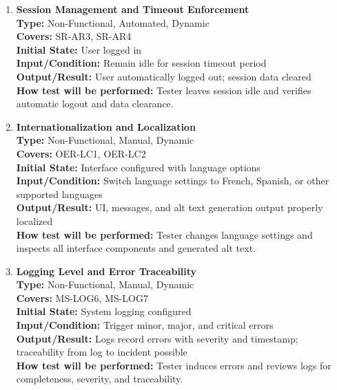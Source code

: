 \documentclass[12pt, titlepage]{article}
\begin{document}
\begin{enumerate}[label=NFR-ST \arabic*., wide=0pt, leftmargin=*]
  \item \textbf{Session Management and Timeout Enforcement} \\[2mm]
    \textbf{Type:} Non-Functional, Automated, Dynamic \\
    \textbf{Covers:} SR-AR3, SR-AR4 \\
    \textbf{Initial State:} User logged in \\
    \textbf{Input/Condition:} Remain idle for session timeout period \\
    \textbf{Output/Result:} User automatically logged out; session
    data cleared \\[2mm]
    \textbf{How test will be performed:} Tester leaves session idle
    and verifies automatic logout and data clearance.

  \item \textbf{Internationalization and Localization} \\[2mm]
    \textbf{Type:} Non-Functional, Manual, Dynamic \\
    \textbf{Covers:} OER-LC1, OER-LC2 \\
    \textbf{Initial State:} Interface configured with language options \\
    \textbf{Input/Condition:} Switch language settings to French,
    Spanish, or other supported languages \\
    \textbf{Output/Result:} UI, messages, and alt text generation
    output properly localized \\[2mm]
    \textbf{How test will be performed:} Tester changes language
    settings and inspects all interface components and generated alt text.

  \item \textbf{Logging Level and Error Traceability} \\[2mm]
    \textbf{Type:} Non-Functional, Manual, Dynamic \\
    \textbf{Covers:} MS-LOG6, MS-LOG7 \\
    \textbf{Initial State:} System logging configured \\
    \textbf{Input/Condition:} Trigger minor, major, and critical errors \\
    \textbf{Output/Result:} Logs record errors with severity and
    timestamp; traceability from log to incident possible \\[2mm]
    \textbf{How test will be performed:} Tester induces errors and
    reviews logs for completeness, severity, and traceability.


\end{enumerate}
\end{document}
